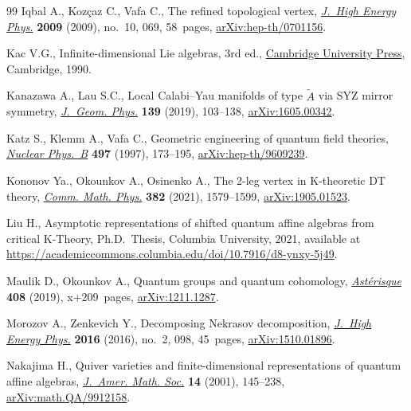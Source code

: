 \begin{thebibliography}{99}
Iqbal A., Koz\c{c}az C., Vafa C., The refined topological vertex,
 \href{https://doi.org/10.1088/1126-6708/2009/10/069}{\textit{J.~High Energy Phys.}} \textbf{2009} (2009), no.~10, 069, 58~pages,
 \href{https://arxiv.org/abs/hep-th/0701156}{arXiv:hep-th/0701156}.

Kac V.G., Infinite-dimensional {L}ie algebras, 3rd ed., \href{https://doi.org/10.1017/CBO9780511626234}{Cambridge University
 Press}, Cambridge, 1990.

Kanazawa A., Lau S.C., Local {C}alabi--{Y}au manifolds of type $\tilde{A}$ via
 {SYZ} mirror symmetry, \href{https://doi.org/10.1016/j.geomphys.2018.12.015}{\textit{J.~Geom. Phys.}} \textbf{139} (2019), 103--138,
 \href{https://arxiv.org/abs/1605.00342}{arXiv:1605.00342}.

Katz S., Klemm A., Vafa C., Geometric engineering of quantum field theories,
 \href{https://doi.org/10.1016/S0550-3213(97)00282-4}{\textit{Nuclear Phys.~B}} \textbf{497} (1997), 173--195,
 \href{https://arxiv.org/abs/hep-th/9609239}{arXiv:hep-th/9609239}.

Kononov Ya., Okounkov A., Osinenko A., The 2-leg vertex in {K}-theoretic {DT}
 theory, \href{https://doi.org/10.1007/s00220-021-03936-z}{\textit{Comm. Math. Phys.}} \textbf{382} (2021), 1579--1599,
 \href{https://arxiv.org/abs/1905.01523}{arXiv:1905.01523}.

Liu H., Asymptotic representations of shifted quantum affine algebras from
 critical {K}-Theory, Ph.D.~Thesis, {C}olumbia University, 2021, available at
 \url{https://academiccommons.columbia.edu/doi/10.7916/d8-ynxy-5j49}.

Maulik D., Okounkov A., Quantum groups and quantum cohomology,
 \href{https://doi.org/10.24033/ast.1074}{\textit{Ast\'erisque}} \textbf{408} (2019), x+209~pages, \href{https://arxiv.org/abs/1211.1287}{arXiv:1211.1287}.

Morozov A., Zenkevich Y., Decomposing {N}ekrasov decomposition, \href{https://doi.org/10.1007/JHEP02(2016)098}{\textit{J.~High
 Energy Phys.}} \textbf{2016} (2016), no.~2, 098, 45~pages,
 \href{https://arxiv.org/abs/1510.01896}{arXiv:1510.01896}.

Nakajima H., Quiver varieties and finite-dimensional representations of quantum
 affine algebras, \href{https://doi.org/10.1090/S0894-0347-00-00353-2}{\textit{J.~Amer. Math. Soc.}} \textbf{14} (2001), 145--238,
 \href{https://arxiv.org/abs/math.QA/9912158}{arXiv:math.QA/9912158}.


\end{thebibliography}
